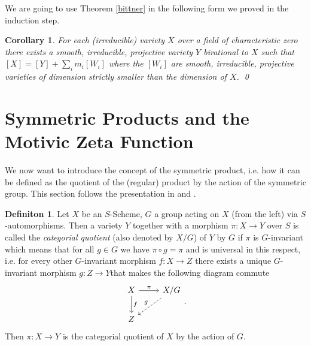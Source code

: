 \documentclass[11pt, a4paper, german]{article}
\theoremstyle{plain}
\newtheorem{corollary}[theorem]{Corollary}
\theoremstyle{definition}
\newtheorem{definition}[theorem]{Definiton}
\begin{document}
We are going to use Theorem \ref{bittner} in the following form we proved in the induction step.

\begin{corollary}
    \label{decomp}
    For each (irreducible) variety $X$ over a field of characteristic zero there exists a smooth, irreducible, projective variety $Y$ birational
    to $X$ such that $[X] = [Y] + \sum_i m_i[W_i]$ where the $[W_i]$ are smooth, irreducible, projective varieties of dimension strictly
    smaller than the dimension of $X$. \qed
\end{corollary}




\section{Symmetric Products and the Motivic Zeta Function}
\label{symProd}
We now want to introduce the concept of the symmetric product, i.e. how it can be defined as the quotient of the (regular) product by the
action of the symmetric group. This section follows the presentation in \cite[Appendix A]{mustata} and \cite[Lecture 10]{harris}.
\begin{definition}
    Let $X$ be an $S$-Scheme, $G$ a group acting on $X$ (from the left) 
    via $S$-automorphisms. Then a variety $Y$ together with a morphism $\pi \colon X \to Y$
    over $S$ is called the 
    \emph{categorial quotient} (also denoted by $X/G$) of $Y$ by $G$ if $\pi$ is $G$-invariant which means that for all $g \in G$ we have
    $\pi \circ g = \pi$ and is universal in this respect, i.e. for every other $G$-invariant morphism $f \colon X \to Z$ there exists a unique
    $G$-invariant morphism $g \colon Z \to Y$that makes the following diagram commute
    \begin{equation*}
        \begin{tikzcd}
            X \arrow{r}{\pi} \arrow{d}{f} & X/G \\
            Z \arrow[dashleftarrow]{ur}{g}
        \end{tikzcd}.
    \end{equation*}
    Then $\pi \colon X \to Y$ is the categorial quotient of $X$ by the action of $G$.
\end{definition}
\end{document}
